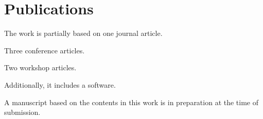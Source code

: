 
%
%

\chapter*{Publications}

The work is partially based on one journal article.
{\newrefcontext[sorting=ynt]\setttsize{\small}\printbibliography[keyword=j,heading=none]}

\noindent Three conference articles.%
{\setttsize{\small}\printbibliography[env=bibliosone,keyword=cn,heading=none]}

\noindent Two workshop articles.%
{\setttsize{\small}\printbibliography[env=bibliosfour,keyword=ws,heading=none]}

\newpage
\noindent Additionally, it includes a software.%
{\setttsize{\small}\printbibliography[env=bibliossix,keyword=sw,heading=none]}

\noindent A manuscript based on the contents in this work is in preparation at the time of submission.%
{\setttsize{\small}\printbibliography[env=bibliosseven,keyword=p,heading=none]}

\newrefcontext[sorting=nyt]

\cleardoublepage   %

